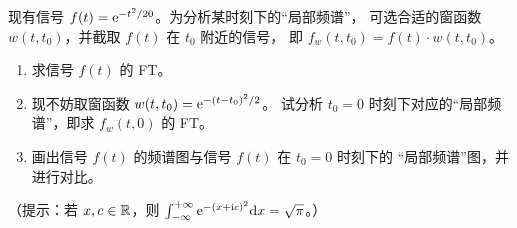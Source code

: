 \begin{exercise}
    现有信号 $f(t) = \mathrm{e}^{-t^2/20}$。为分析某时刻下的``局部频谱''，
    可选合适的窗函数 $w(t, t_0)$，并截取 $f(t)$ 在 $t_0$ 附近的信号，
    即 $f_w(t, t_0) = f(t)\cdot w(t, t_0)$。
    \begin{enumerate}[label=(\arabic*)]
        \item 求信号 $f(t)$ 的 FT。
        \item 现不妨取窗函数 $w(t, t_0) = \mathrm{e}^{-(t - t_0)^2/2}$。
            试分析 $t_0 = 0$ 时刻下对应的``局部频谱''，即求 $f_w(t, 0)$ 的 FT。
        \item 画出信号 $f(t)$ 的频谱图与信号 $f(t)$ 在 $t_0 = 0$ 时刻下的
            ``局部频谱''图，并进行对比。
    \end{enumerate}
    （提示：若 $x, c \in \mathbb{R}$，则 $\int_{-\infty}^{+\infty}\mathrm{e}^{-(x + \mathrm{i} c)^2}\mathrm{d}x = \sqrt{\pi}$。）
\end{exercise}

